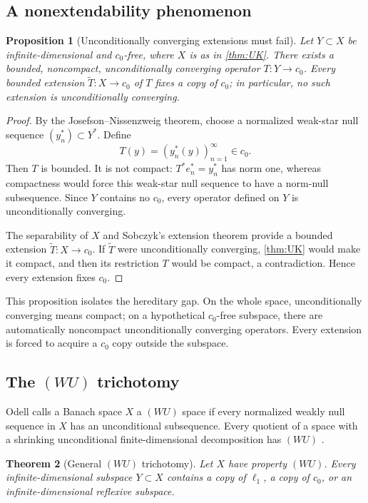 \documentclass[11pt]{article}
\newtheorem{theorem}{Theorem}[section]
\newtheorem{proposition}[theorem]{Proposition}
\theoremstyle{definition}
\begin{document}
\subsection{A nonextendability phenomenon}

\begin{proposition}[Unconditionally converging extensions must fail]
\label{prop:extension}
Let $Y\subset X$ be infinite-dimensional and $c_0$-free, where $X$ is as in
\cref{thm:UK}.  There exists a bounded, noncompact, unconditionally
converging operator $T:Y\to c_0$.  Every bounded extension
$\widetilde T:X\to c_0$ of $T$ fixes a copy of $c_0$; in particular, no such
extension is unconditionally converging.
\end{proposition}

\begin{proof}
By the Josefson--Nissenzweig theorem, choose a normalized weak-star null
sequence $(y_n^*)\subset Y^*$.  Define
\[
       T(y)=(y_n^*(y))_{n=1}^\infty\in c_0.
\]
Then $T$ is bounded.  It is not compact: $T^*e_n^*=y_n^*$ has norm one,
whereas compactness would force this weak-star null sequence to have a
norm-null subsequence.  Since $Y$ contains no $c_0$, every operator defined
on $Y$ is unconditionally converging.

The separability of $X$ and Sobczyk's extension theorem provide a bounded
extension $\widetilde T:X\to c_0$.  If $\widetilde T$ were unconditionally
converging, \cref{thm:UK} would make it compact, and then its restriction
$T$ would be compact, a contradiction.  Hence every extension fixes $c_0$.
\end{proof}

This proposition isolates the hereditary gap.  On the whole space,
unconditionally converging means compact; on a hypothetical $c_0$-free
subspace, there are automatically noncompact unconditionally converging
operators.  Every extension is forced to acquire a $c_0$ copy outside the
subspace.

\subsection{The $(WU)$ trichotomy}

Odell calls a Banach space $X$ a $(WU)$ space if every normalized weakly null
sequence in $X$ has an unconditional subsequence.  Every quotient of a space
with a shrinking unconditional finite-dimensional decomposition has $(WU)$
\cite[Theorem~A]{Odell1992}.

\begin{theorem}[General $(WU)$ trichotomy]\label{thm:WU}
Let $X$ have property $(WU)$.  Every infinite-dimensional subspace
$Y\subset X$ contains a copy of $\ell_1$, a copy of $c_0$, or an
infinite-dimensional reflexive subspace.
\end{theorem}
\end{document}
